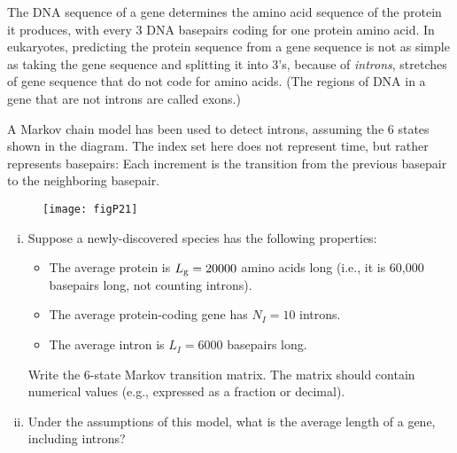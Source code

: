 \documentclass[12pt,letterpaper]{article}
\begin{document}

The DNA sequence of a gene determines the amino acid sequence of the protein it produces, with every 3 DNA basepairs coding for one protein amino acid. In eukaryotes, predicting the protein sequence from a gene sequence is not as simple as taking the gene sequence and splitting it into 3's, because of \emph{introns}, stretches of gene sequence that do not code for amino acids. (The regions of DNA in a gene that are not introns are called exons.)

A Markov chain model has been used to detect introns, assuming the 6 states shown in the diagram. The index set here does not represent time, but rather represents basepairs: Each increment is the transition from the previous basepair to the neighboring basepair.
\begin{figure}[h!]
\centering\texttt{[image: figP21]}
\end{figure}

\begin{enumerate}[i. ]
\item Suppose a newly-discovered species has the following properties:
\begin{itemize}
\item The average protein is $L_{\rm g} = 20000$ amino acids long (i.e., it is 60,000 basepairs long, not counting introns).
\item The average protein-coding gene has $N_I=10$ introns.
\item The average intron is $L_I=6000$ basepairs long. 
\end{itemize}
Write the 6-state Markov transition matrix. The matrix should contain numerical values (e.g., expressed as a fraction or decimal). 
\item Under the assumptions of this model, what is the average length of a gene, including introns?
\end{enumerate}



\end{document}
